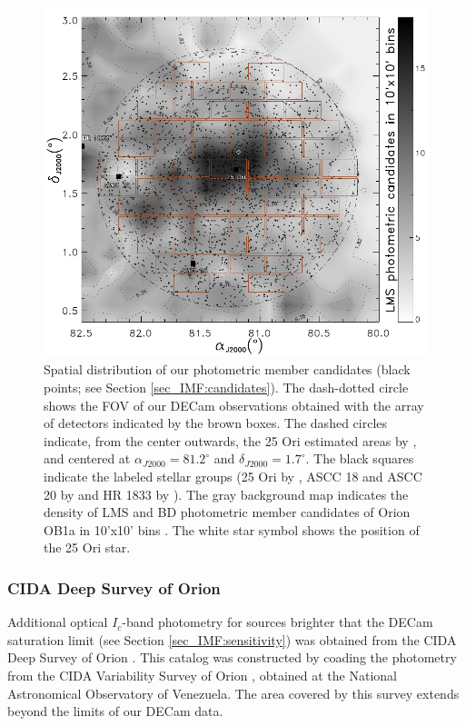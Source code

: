\documentclass[12pt]{article}
\begin{document}
\begin{figure}[ht!]
	\includegraphics[width=1.0\textwidth]{f_1.pdf}
	\caption[Spatial distribution of our photometric member candidates.]{Spatial distribution of our photometric member candidates (black points; see Section \ref{sec_IMF:candidates}). The dash-dotted circle shows the FOV of our DECam observations obtained with the array of detectors indicated by the brown boxes. The dashed circles indicate, from the center outwards, the 25 Ori estimated areas by \citet[0.5$^\circ$ radius; ][]{Downes2014}, \citet[0.7$^\circ$ radius; ][]{Briceno2018} and \citet[1.0$^\circ$ radius; ][]{Briceno2005,Briceno2007} centered at $\alpha_{J2000}=81.2^\circ$ and $\delta_{J2000}=1.7^\circ$. The black squares indicate the labeled stellar groups (25 Ori by \citealt{Briceno2005}, ASCC 18 and ASCC 20 by \citealt{Kharchenko2013} and HR 1833 by \citealt{Briceno2018}). The gray background map indicates the density of LMS and BD photometric member candidates of Orion OB1a in 10'x10' bins \citep{Downes2014}. The white star symbol shows the position of the 25 Ori star.}
	\label{fig_IMF:sky}
\end{figure}

\subsubsection{CIDA Deep Survey of Orion}
\label{sec_IMF:CDSO}
Additional optical $I_c$-band photometry for sources brighter that the DECam saturation limit (see Section \ref{sec_IMF:sensitivity}) was obtained from the CIDA Deep Survey of Orion \citep[\ac{CDSO}; ][]{Downes2014}. This catalog was constructed by coading the photometry from the CIDA Variability Survey of Orion \citep[\ac{CVSO}; ][]{Briceno2005,Mateu2012,Briceno2018}, obtained at the National Astronomical Observatory of Venezuela. The area covered by this survey extends beyond the limits of our DECam data.
\end{document}

